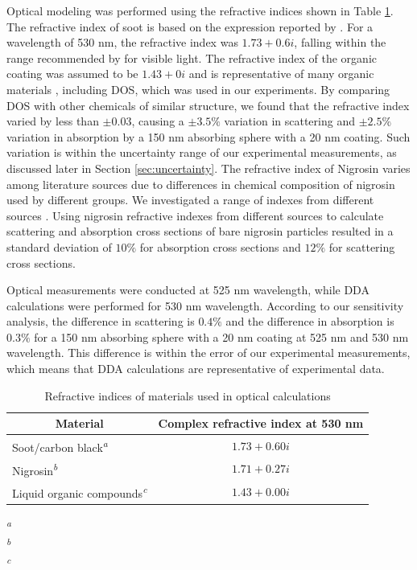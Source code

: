 Optical modeling was performed using the refractive indices shown in Table \ref{tab:refindices}. The refractive index of soot is based on the expression reported by \citet{RN23}. For a wavelength of 530 nm, the refractive index was $1.73+0.6i$, falling within the range recommended by \citet{RN34} for visible light. The refractive index of the organic coating was assumed to be $1.43+0i$ and is representative of many organic materials \citep{crchandbook}, including DOS, which was used in our experiments. By comparing DOS with other chemicals of similar structure, we found that the refractive index varied by less than  $\pm0.03$, causing a $\pm 3.5\%$ variation in scattering and $\pm 2.5\%$ variation in absorption by a 150 nm absorbing sphere with a 20 nm coating. Such variation is within the uncertainty range of our experimental measurements, as discussed later in Section \ref{sec:uncertainty}. The refractive index of Nigrosin varies among literature sources due to differences in chemical composition of nigrosin used by different groups. We investigated a range of indexes from different sources \citep{RN15,lack2006aerosol,bluvshtein2012approach,dinar2008complex,flores2014complex}. Using nigrosin refractive indexes from different sources to calculate scattering and absorption cross sections of bare nigrosin particles resulted in a standard deviation of $10\%$ for absorption cross sections and $12\%$ for scattering cross sections.

Optical measurements were conducted at 525 nm wavelength, while DDA calculations were performed for 530 nm wavelength. According to our sensitivity analysis, the difference in scattering is $0.4 \%$ and the difference in absorption is $0.3 \%$ for a 150 nm absorbing sphere with a 20 nm coating at 525 nm and 530 nm wavelength. This difference is within the error of our experimental measurements, which means that DDA calculations are representative of experimental data.

\begin{table}[ht]
\caption{Refractive indices of materials used in optical calculations}
\label{tab:refindices}
\begin{center}
\begin{tabular}{l c}
 \hline
 \multicolumn{1}{c}{Material} & Complex refractive index at 530 nm \\
 \hline
 Soot/carbon black\textsuperscript{\textit{a}} & $1.73+0.60i$\\
 Nigrosin\textsuperscript{\textit{b}} & $1.71+0.27i$\\
 Liquid organic compounds\textsuperscript{\textit{c}} & $1.43+0.00i$\\
 \hline
\end{tabular}
\end{center}

\textsuperscript{\textit{a}}\citet{RN23}\\
\textsuperscript{\textit{b}}\citet{RN15}\\
\textsuperscript{\textit{c}}\citet{RN22}
\end{table}

